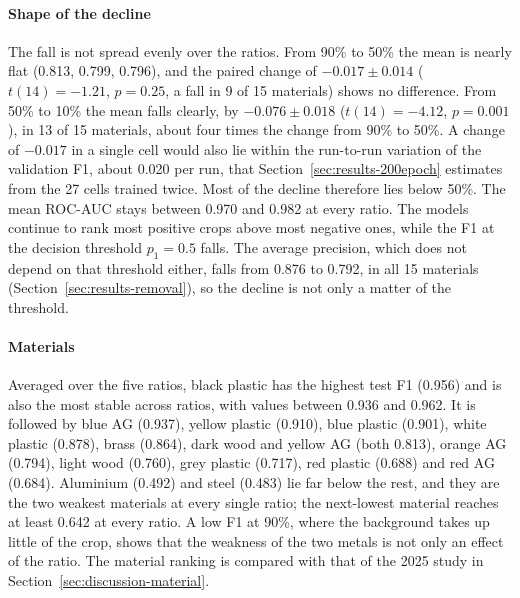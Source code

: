 \paragraph{Shape of the decline}
The fall is not spread evenly over the ratios. From 90\% to 50\% the mean is nearly
flat (0.813, 0.799, 0.796), and the paired change of $-0.017 \pm 0.014$
($t(14) = -1.21$, $p = 0.25$, a fall in 9 of 15 materials) shows no difference. From
50\% to 10\% the mean falls clearly, by $-0.076 \pm 0.018$ ($t(14) = -4.12$,
$p = 0.001$), in 13 of 15 materials, about four times the change from 90\% to 50\%.
A change of $-0.017$ in a single cell would also lie within the run-to-run variation of
the validation F1, about 0.020 per run, that Section~\ref{sec:results-200epoch}
estimates from the 27 cells trained twice.
Most of the decline therefore lies below 50\%. The mean ROC-AUC stays between 0.970 and
0.982 at every ratio. The models continue to rank most positive crops above most
negative ones, while the F1 at the decision threshold $p_1 = 0.5$ falls. The average
precision, which does not depend on that threshold either, falls from 0.876 to 0.792,
in all 15 materials (Section~\ref{sec:results-removal}), so the decline is not only a
matter of the threshold.

\paragraph{Materials}
Averaged over the five ratios, black plastic has the highest test F1 (0.956) and is
also the most stable across ratios, with values between 0.936 and 0.962. It is
followed by blue AG (0.937), yellow plastic (0.910), blue plastic (0.901), white
plastic (0.878), brass (0.864), dark wood and yellow AG (both 0.813), orange AG (0.794),
light wood (0.760), grey plastic (0.717), red plastic (0.688) and red AG (0.684).
Aluminium (0.492) and steel (0.483) lie far below the rest, and they are the two
weakest materials at every single ratio; the next-lowest material reaches at least
0.642 at every ratio. A low F1 at 90\%, where the background takes up little of the
crop, shows that the weakness of the two metals is not only an effect of the ratio.
The material ranking is compared with that of the 2025 study in
Section~\ref{sec:discussion-material}.


